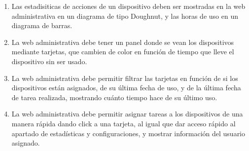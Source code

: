\begin{enumerate}
    \item Las estadisiticas de acciones de un dispositivo deben ser mostradas en la web administrativa en un diagrama de tipo Doughnut, y las horas de uso en un diagrama de barras.
    
    \item La web administrativa debe tener un panel donde se vean los dispositivos mediante tarjetas, que cambien de color en función de tiempo que lleve el dispositivo sin ser usado.
    
    \item La web administrativa debe permitir filtrar las tarjetas en función de si los dispositivos están asignados, de su última fecha de uso, y de la última fecha de tarea realizada, mostrando cuánto tiempo hace de su último uso.
    
    \item La web administrativa debe permitir asignar tareas a los dispositivos de una manera rápida dando click a una tarjeta, al igual que dar acceso rápido al apartado de estadísticas y configuraciones, y mostrar información del usuario asignado.
    
\end{enumerate}